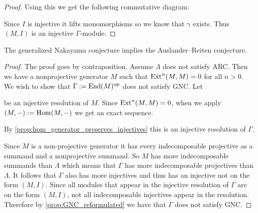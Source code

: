 \begin{prop}
\begin{proof}
		Using this we get the following commutative diagram:
		\begin{center}
		\end{center}
		Since $I$ is injective it lifts monomorphisms so we know that $\gamma$ exists. Thus $(M, I)$ is an injective $\Gamma$-module.
	\end{proof}
\end{prop}

\begin{theorem}\label{thm:GNC_implies_ARC}
	The generalized Nakayama conjecture implies the Auslander--Reiten conjecture.
	\begin{proof}
		The proof goes by contraposition. Assume $\Lambda$ does not satisfy ARC. Then we have a nonprojective generator $M$ such that $\operatorname{Ext}^n(M, M)=0$ for all $n>0$. We wish to show that $\Gamma := \operatorname{End}(M)^{\operatorname{op}}$ does not satisfy GNC. Let
		\begin{center}
		\end{center}
		be an injective resolution of $M$. Since $\operatorname{Ext}^n(M,M)=0$, when we apply $(M,-):=\operatorname{Hom}(M,-)$ we get an exact sequence.
		\begin{center}
		\end{center}
		By \cref{prop:hom_generator_preserves_injectives} this is an injective resolution of $\Gamma$.
		
		Since $M$ is a non-projective generator it has every indecomposable projective as a summand and a nonprojective summand. So $M$ has more indecomposable summands than $\Lambda$ which means that $\Gamma$ has more indecomposable projectives than $\Lambda$. It follows that $\Gamma$ also has more injectives and thus has an injective not on the form $(M, I)$. Since all modules that appear in the injective resolution of $\Gamma$ are on the form $(M, I)$, not all indecomposable injectives appear in the resolution. Therefore by \cref{prop:GNC_reformulated} we have that $\Gamma$ does not satisfy GNC.
	\end{proof}
\end{theorem}

